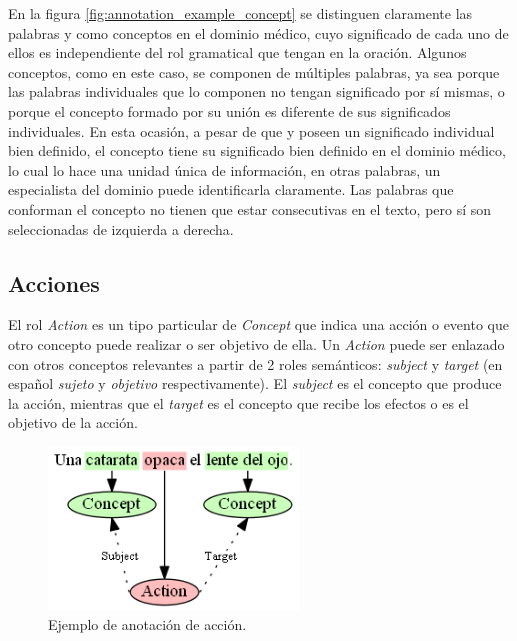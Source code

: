 En la figura \ref{fig:annotation_example_concept} se distinguen claramente las palabras  y  como conceptos en el dominio médico, cuyo significado de cada uno de ellos es independiente del rol gramatical que tengan en la oración. Algunos conceptos, como  en este caso, se componen de múltiples palabras, ya sea porque las palabras individuales que lo componen no tengan significado por sí mismas, o porque el concepto formado por su unión es diferente de sus significados individuales. En esta ocasión, a pesar de que  y  poseen un significado individual bien definido, el concepto  tiene su significado bien definido en el dominio médico, lo cual lo hace una unidad única de información, en otras palabras, un especialista del dominio puede identificarla claramente. Las palabras que conforman el concepto no tienen que estar consecutivas en el texto, pero sí son seleccionadas de izquierda a derecha.

\subsection{Acciones}
El rol {\it Action} es un tipo particular de {\it Concept} que indica una acción o evento que otro concepto puede realizar o ser objetivo de ella. Un {\it Action} puede ser enlazado con otros conceptos relevantes a partir de 2 roles semánticos: {\it subject} y {\it target} (en español {\it sujeto} y {\it objetivo} respectivamente). El {\it subject} es el concepto que produce la acción, mientras que el {\it target} es el concepto que recibe los efectos o es el objetivo de la acción.

\begin{figure}[H]
	\begin{center}
		\includegraphics[height=1.7in]{graphics/annotation_example_action.png}
		\caption[Anotación de acción]{Ejemplo de anotación de acción.}
		\label{fig:annotation_example_action}
	\end{center}
\end{figure}

